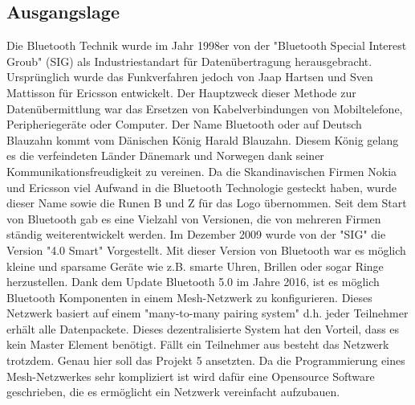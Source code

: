 
\subsection{Ausgangslage}\label{subsec:Ausgangslage}

Die Bluetooth Technik wurde im Jahr 1998er von der "Bluetooth Special Interest Groub" (SIG) als Industriestandart für Datenübertragung herausgebracht. Ursprünglich wurde das Funkverfahren jedoch von Jaap Hartsen und Sven Mattisson für Ericsson entwickelt. Der Hauptzweck dieser Methode zur Datenübermittlung war das Ersetzen von Kabelverbindungen von Mobiltelefone, Peripheriegeräte oder Computer. Der Name Bluetooth oder auf Deutsch Blauzahn kommt vom Dänischen König Harald Blauzahn. Diesem König gelang es die verfeindeten Länder Dänemark und Norwegen dank seiner Kommunikationsfreudigkeit zu vereinen. Da die Skandinavischen Firmen Nokia und Ericsson viel Aufwand in die Bluetooth Technologie gesteckt haben, wurde dieser Name sowie die Runen B und Z für das Logo übernommen. Seit dem Start von Bluetooth gab es eine Vielzahl von Versionen, die von mehreren Firmen ständig weiterentwickelt werden. Im Dezember 2009 wurde von der "SIG" die Version "4.0 Smart" Vorgestellt. Mit dieser Version von Bluetooth war es möglich kleine und sparsame Geräte wie z.B. smarte Uhren, Brillen oder sogar Ringe herzustellen. Dank dem Update Bluetooth 5.0 im Jahre 2016, ist es möglich Bluetooth Komponenten in einem Mesh-Netzwerk zu konfigurieren. Dieses Netzwerk basiert auf einem "many-to-many pairing system" d.h. jeder Teilnehmer erhält alle Datenpackete. Dieses dezentralisierte System hat den Vorteil, dass es kein Master Element benötigt. Fällt ein Teilnehmer aus besteht das Netzwerk trotzdem. Genau hier soll das Projekt 5 ansetzten. Da die Programmierung eines Mesh-Netzwerkes sehr kompliziert ist wird dafür eine Opensource Software geschrieben, die es ermöglicht ein Netzwerk vereinfacht aufzubauen. 










